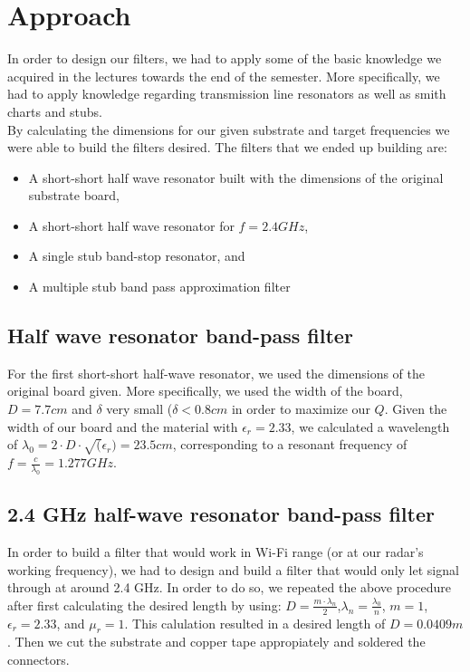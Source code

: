 \documentclass[letterpaper, 11pt, twocolumn]{article}
\begin{document}
\section{Approach}
In order to design our filters, we had to apply some of the basic knowledge we acquired in the lectures towards the end of the semester. More specifically, we had to apply knowledge regarding transmission line resonators as well as smith charts and stubs.
\\
By calculating the dimensions for our given substrate and target frequencies we were able to build the filters desired. The filters that we ended up building are:
\begin{itemize}
    \item A short-short half wave resonator built with the dimensions of the original substrate board,
    \item A short-short half wave resonator for $f=2.4 GHz$,
    \item A single stub band-stop resonator, and
    \item A multiple stub band pass approximation filter
\end{itemize}
\subsection{Half wave resonator band-pass filter}
For the first short-short half-wave resonator, we used the dimensions of the original board given. More specifically, we used the width of the board, $D=7.7cm$ and $\delta$ very small (\(\delta<0.8cm\) in order to maximize our $Q$. Given the width of our board and the material with $\epsilon_r=2.33$, we calculated a wavelength of \(\lambda_0=2\cdot D \cdot\sqrt(\epsilon_r)=23.5cm\), corresponding to a resonant frequency of $f=\frac{c}{\lambda_0}=1.277GHz$.

\subsection{2.4 GHz half-wave resonator band-pass filter}
In order to build a filter that would work in Wi-Fi range (or at our radar's working frequency), we had to design and build a filter that would only let signal through at around 2.4 GHz. In order to do so, we repeated the above procedure after first calculating the desired length by using: \(D=\frac{m\cdot\lambda_n}{2}\),\(\lambda_n=\frac{\lambda_0}{n}\), \(m=1\),\(\epsilon_r=2.33\), and \(\mu_r=1\). This calulation resulted in a desired length of \(D=0.0409m\). Then we cut the substrate and copper tape appropiately and soldered the connectors. 
\end{document}

